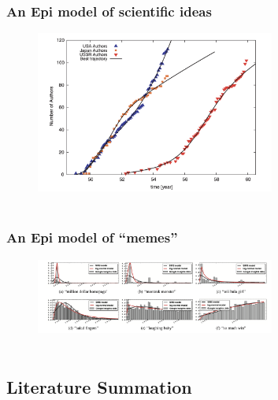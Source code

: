 \documentclass[pdflatex]{beamer}
\begin{document}
\begin{frame}
	\frametitle{An Epi model of scientific ideas}
\begin{figure}[!ht] \centering  %
	\caption{ ~\href{http://web.mit.edu/dikaiser/www/BAKC.PhysA.pdf}{\cite{bettencourt2006power}}}
	\label{fig:science_ideas_curve}
	\centerline{\includegraphics[width=0.7\textwidth]{./figures/Feynman.png}}
\end{figure}
\end{frame}


\begin{frame}
	\frametitle{An Epi model of ``memes''}
	\begin{figure}[!ht] \centering  %
		\caption{ ~\href{https://github.com/iworld1991/EpiExp/blob/master/Literature/bauckhage2011insights.pdf}{\cite{bauckhage2011insights}}}
		\label{fig:memes_curve}
		\centerline{\includegraphics[width=0.7\textwidth]{./figures/Memes.png}}
	\end{figure}
\end{frame}


\subsection{Literature Summation}
\end{document}
